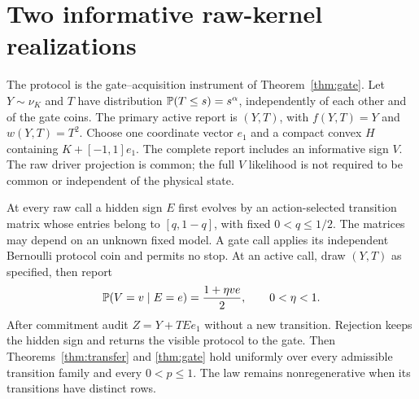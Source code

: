 \section{Two informative raw-kernel realizations}
\label{sec:realizations}
The protocol is the gate--acquisition instrument of Theorem~\ref{thm:gate}. Let $Y\sim\nu_K$ and $T$ have distribution $\mathbb P(T\le s)=s^\alpha$, independently of each other and of the gate coins. The primary active report is $(Y,T)$, with $f(Y,T)=Y$ and $w(Y,T)=T^2$. Choose one coordinate vector $e_1$ and a compact convex $H$ containing $K+[-1,1]e_1$. The complete report includes an informative sign $V$. The raw driver projection is common; the full $V$ likelihood is not required to be common or independent of the physical state.

\begin{theorem}\label{thm:classical}
At every raw call a hidden sign $E$ first evolves by an action-selected transition matrix whose entries belong to $[q,1-q]$, with fixed $0<q\le1/2$. The matrices may depend on an unknown fixed model. A gate call applies its independent Bernoulli protocol coin and permits no stop. At an active call, draw $(Y,T)$ as specified, then report
\[
 \mathbb P(V=v\mid E=e)=\frac{1+\eta ve}{2},\qquad 0<\eta<1.
\]
After commitment audit $Z=Y+TEe_1$ without a new transition. Rejection keeps the hidden sign and returns the visible protocol to the gate. Then Theorems~\ref{thm:transfer} and \ref{thm:gate} hold uniformly over every admissible transition family and every $0<p\le1$. The law remains nonregenerative when its transitions have distinct rows.
\end{theorem}
